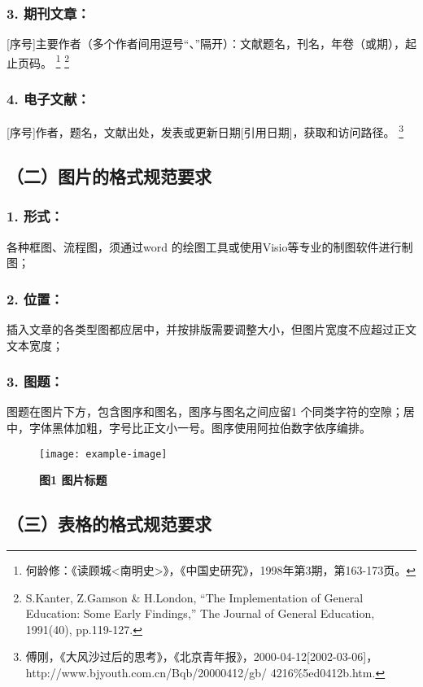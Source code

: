 \documentclass[UTF8,AutoFakeBold]{ctexbook}
\begin{document}
\subsubsection*{3. 期刊文章：}
[序号]主要作者（多个作者间用逗号“、”隔开）：文献题名，刊名，年卷（或期），起止页码。 \footnote[4]{何龄修：《读顾城<南明史>》，《中国史研究》，1998年第3期，第163-173页。} \footnote[5]{S.Kanter, Z.Gamson \& H.London, “The Implementation of General Education: Some Early Findings,” The Journal of General Education, 1991(40), pp.119-127.}

\subsubsection*{4. 电子文献：}
[序号]作者，题名，文献出处，发表或更新日期[引用日期]，获取和访问路径。 \footnote[6]{傅刚，《大风沙过后的思考》，《北京青年报》，2000-04-12[2002-03-06]，http://www.bjyouth.com.cn/Bqb/20000412/gb/ 4216\%5ed0412b.htm.}

\subsection*{（二）图片的格式规范要求}

\subsubsection*{1. 形式：}
各种框图、流程图，须通过word 的绘图工具或使用Visio等专业的制图软件进行制图；

\subsubsection*{2. 位置：}
插入文章的各类型图都应居中，并按排版需要调整大小，但图片宽度不应超过正文文本宽度；

\subsubsection*{3. 图题：}
图题在图片下方，包含图序和图名，图序与图名之间应留1 个同类字符的空隙；居中，字体黑体加粗，字号比正文小一号。图序使用阿拉伯数字依序编排。

\begin{figure}[h]
\centering
\texttt{[image: example-image]}
\caption*{\heiti\bfseries{} 图1 图片标题}
\end{figure}

\subsection*{（三）表格的格式规范要求}
\end{document}
